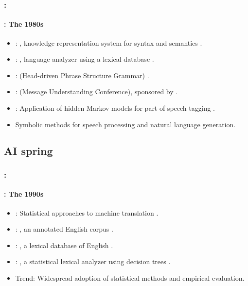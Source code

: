 \documentclass[xcolor=table]{beamer}
\begin{document}
\begin{frame}
	\frametitle{\insertshortsubtitle: \insertsection}
	\framesubtitle{\insertsubsection: The 1980s}

	\begin{itemize}
		\item {}: , knowledge representation system for syntax and semantics \cite{1980-bobrow}.
		\item {}: , language analyzer using a lexical database \cite{1986-jacobs}.
		\item {}:  (Head-driven Phrase Structure Grammar) \cite{1987-sag-pollard}.
		\item {}:  (Message Understanding Conference), sponsored by .
		\item {}: Application of hidden Markov models for part-of-speech tagging \cite{1988-church}.
		\item Symbolic methods for speech processing and natural language generation.
	\end{itemize}

\end{frame}

\subsection{AI spring}

\begin{frame}
	\frametitle{\insertshortsubtitle: \insertsection}
	\framesubtitle{\insertsubsection: The 1990s}
	
	\begin{itemize}
		\item {}: Statistical approaches to machine translation \cite{1990-brown-al}.
		\item {}: , an annotated English corpus \cite{1993-marcus-al}.
		\item {}: , a lexical database of English \cite{1995-miller}.
		\item {}: , a statistical lexical analyzer using decision trees \cite{1996-magerman}.
		\item Trend: Widespread adoption of statistical methods and empirical evaluation.
	\end{itemize}

\end{frame}
\end{document}
